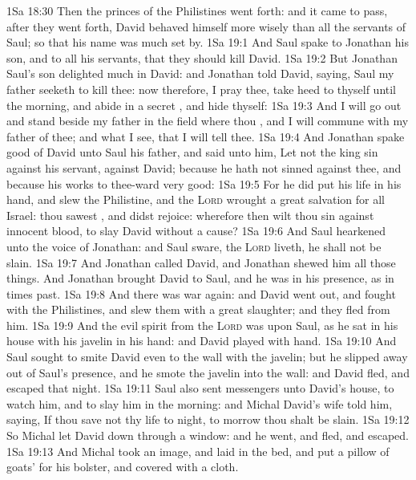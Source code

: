 \vs 1Sa 18:30 Then the princes of the Philistines went forth: and it came to pass, after they went forth,  David behaved himself more wisely than all the servants of Saul; so that his name was much set by.
\vs 1Sa 19:1 And Saul spake to Jonathan his son, and to all his servants, that they should kill David.
\vs 1Sa 19:2 But Jonathan Saul's son delighted much in David: and Jonathan told David, saying, Saul my father seeketh to kill thee: now therefore, I pray thee, take heed to thyself until the morning, and abide in a secret , and hide thyself:
\vs 1Sa 19:3 And I will go out and stand beside my father in the field where thou , and I will commune with my father of thee; and what I see, that I will tell thee.
\vs 1Sa 19:4 And Jonathan spake good of David unto Saul his father, and said unto him, Let not the king sin against his servant, against David; because he hath not sinned against thee, and because his works  to thee-ward very good:
\vs 1Sa 19:5 For he did put his life in his hand, and slew the Philistine, and the \textsc{Lord} wrought a great salvation for all Israel: thou sawest , and didst rejoice: wherefore then wilt thou sin against innocent blood, to slay David without a cause?
\vs 1Sa 19:6 And Saul hearkened unto the voice of Jonathan: and Saul sware,  the \textsc{Lord} liveth, he shall not be slain.
\vs 1Sa 19:7 And Jonathan called David, and Jonathan shewed him all those things. And Jonathan brought David to Saul, and he was in his presence, as in times past.
\vs 1Sa 19:8 And there was war again: and David went out, and fought with the Philistines, and slew them with a great slaughter; and they fled from him.
\vs 1Sa 19:9 And the evil spirit from the \textsc{Lord} was upon Saul, as he sat in his house with his javelin in his hand: and David played with  hand.
\vs 1Sa 19:10 And Saul sought to smite David even to the wall with the javelin; but he slipped away out of Saul's presence, and he smote the javelin into the wall: and David fled, and escaped that night.
\vs 1Sa 19:11 Saul also sent messengers unto David's house, to watch him, and to slay him in the morning: and Michal David's wife told him, saying, If thou save not thy life to night, to morrow thou shalt be slain.
\vs 1Sa 19:12 So Michal let David down through a window: and he went, and fled, and escaped.
\vs 1Sa 19:13 And Michal took an image, and laid  in the bed, and put a pillow of goats'  for his bolster, and covered  with a cloth.
